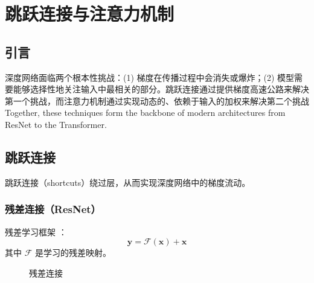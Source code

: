 \clearpage
\cleardoublepage

\chapter{跳跃连接与注意力机制}

\section{引言}

深度网络面临两个根本性挑战：(1) 梯度在传播过程中会消失或爆炸；(2) 模型需要能够选择性地关注输入中最相关的部分。跳跃连接通过提供梯度高速公路来解决第一个挑战，而注意力机制通过实现动态的、依赖于输入的加权来解决第二个挑战 Together, these techniques form the backbone of modern architectures from ResNet to the Transformer.

\section{跳跃连接}

跳跃连接（shortcuts）绕过层，从而实现深度网络中的梯度流动。

\subsection{残差连接（ResNet）}

残差学习框架 \cite{he2016deep}：
\begin{equation}
\mathbf{y} = \mathcal{F}(\mathbf{x}) + \mathbf{x}
\end{equation}
其中 $\mathcal{F}$ 是学习的残差映射。

\begin{figure}[htbp]
    \centering
    \caption{残差连接}
    \label{fig:residual}
\end{figure}

